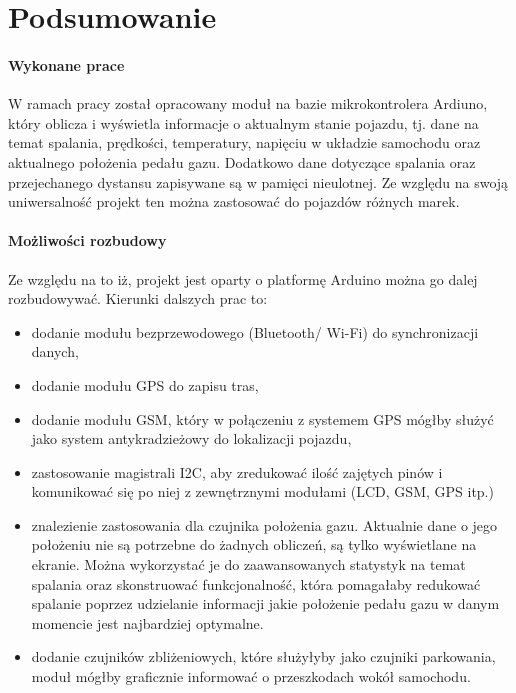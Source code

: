 \chapter{Podsumowanie}
\subsubsection{Wykonane prace}
W ramach pracy został opracowany moduł na bazie mikrokontrolera Ardiuno, który oblicza i wyświetla informacje o aktualnym stanie pojazdu, tj. dane na temat spalania, prędkości, temperatury, napięciu w układzie samochodu oraz aktualnego położenia pedału gazu. Dodatkowo dane dotyczące spalania oraz przejechanego dystansu zapisywane są w pamięci nieulotnej. Ze względu na swoją uniwersalność projekt ten można zastosować do pojazdów różnych marek.
\subsubsection{Możliwości rozbudowy}
Ze względu na to iż, projekt jest oparty o platformę Arduino można go dalej rozbudowywać.  Kierunki dalszych prac to:
\begin{itemize}
\item dodanie modułu bezprzewodowego (Bluetooth/ Wi-Fi) do synchronizacji danych,
\item dodanie modułu GPS do zapisu tras,
\item dodanie modułu GSM, który w połączeniu z systemem GPS mógłby służyć jako system antykradzieżowy do lokalizacji pojazdu,
\item zastosowanie magistrali I2C, aby zredukować ilość zajętych pinów i komunikować się po niej z zewnętrznymi modułami (LCD, GSM, GPS itp.)
\item znalezienie zastosowania dla czujnika położenia gazu. Aktualnie dane o jego położeniu nie są potrzebne do żadnych obliczeń, są tylko wyświetlane na ekranie. Można wykorzystać je do zaawansowanych statystyk na temat spalania oraz skonstruować funkcjonalność, która pomagałaby redukować spalanie poprzez udzielanie informacji jakie położenie pedału gazu w danym momencie jest najbardziej optymalne.
\item dodanie czujników zbliżeniowych, które służyłyby jako czujniki parkowania, moduł mógłby graficznie informować o przeszkodach wokół samochodu.
\end{itemize}

